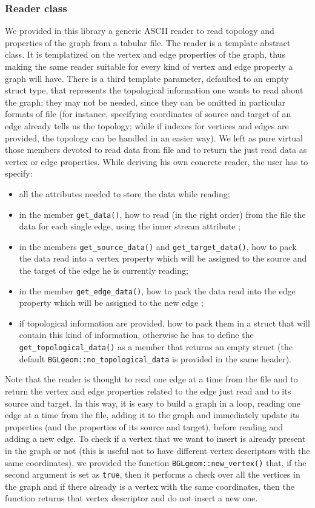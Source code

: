 \documentclass[10pt]{article} %
\begin{document}
	\subsubsection{Reader class}		
	We provided in this library a generic ASCII reader to read topology and properties of the graph from a tabular file. The reader is a template abstract class. It is templatized on the vertex and edge properties of the graph, thus making the same reader suitable for every kind of vertex and edge property a graph will have. There is a third template parameter, defaulted to an empty struct type, that represents the topological information one wants to read about the graph; they may not be needed, since they can be omitted in particular formats of file (for instance, specifying coordinates of source and target of an edge already tells us the topology; while if indexes for vertices and edges are provided, the topology can be handled in an easier way). \newline
	We left as pure virtual those members devoted to read data from file and to return the just read data as vertex or edge properties. While deriving his own concrete reader, the user has to specify:
	\begin{itemize}
		\item all the attributes needed to store the data while reading;
		\item in the member \texttt{get\_data()}, how to read (in the right order) from the file the data for each single edge, using the inner stream attribute ;
		\item in the members \texttt{get\_source\_data()} and \texttt{get\_target\_data()}, how to pack the data read into a vertex property which will be assigned to the source and the target of the edge he is currently reading;
		\item in the member \texttt{get\_edge\_data()}, how to pack the data read into the edge property which will be assigned to the new edge ;
		\item if topological information are provided, how to pack them in a struct that will contain this kind of information, otherwise he has to define the \texttt{get\_topological\_data()} as a member that returns an empty struct (the default \texttt{BGLgeom::no\_topological\_data} is provided in the same header).
	\end{itemize}
	Note that the reader is thought to read one edge at a time from the file and to return the vertex and edge properties related to the edge just read and to its source and target. In this way, it is easy to build a graph in a loop, reading one edge at a time from the file, adding it to the graph and immediately update its properties (and the properties of its source and target), before reading and adding a new edge. To check if a vertex that we want to insert is already present in the graph or not (this is useful not to have different vertex descriptors with the same coordinates), we provided the function \texttt{BGLgeom::new\_vertex()} that, if the second argument is set as \texttt{true}, then it performs a check over all the vertices in the graph and if there already is a vertex with the same coordinates, then the function returns that vertex descriptor and do not insert a new one. \newline
\end{document}
